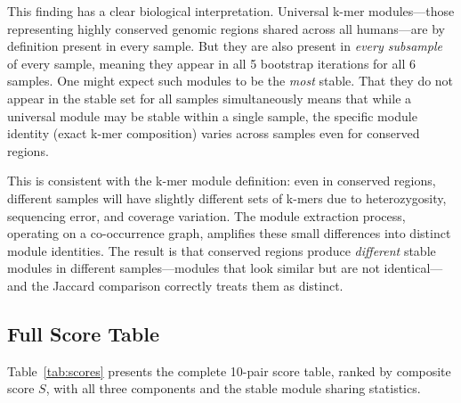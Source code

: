 \documentclass{../yalumba}
\begin{document}
This finding has a clear biological interpretation.  Universal k-mer
modules---those representing highly conserved genomic regions shared across all
humans---are by definition present in every sample.  But they are also present
in \emph{every subsample} of every sample, meaning they appear in all 5
bootstrap iterations for all 6 samples.  One might expect such modules to be
the \emph{most} stable.  That they do not appear in the stable set for all
samples simultaneously means that while a universal module may be stable within
a single sample, the specific module identity (exact k-mer composition) varies
across samples even for conserved regions.

This is consistent with the k-mer module definition: even in conserved regions,
different samples will have slightly different sets of k-mers due to
heterozygosity, sequencing error, and coverage variation.  The module
extraction process, operating on a co-occurrence graph, amplifies these small
differences into distinct module identities.  The result is that conserved
regions produce \emph{different} stable modules in different samples---modules
that look similar but are not identical---and the Jaccard comparison correctly
treats them as distinct.

\subsection{Full Score Table}

Table~\ref{tab:scores} presents the complete 10-pair score table, ranked by
composite score $S$, with all three components and the stable module sharing
statistics.
\end{document}
